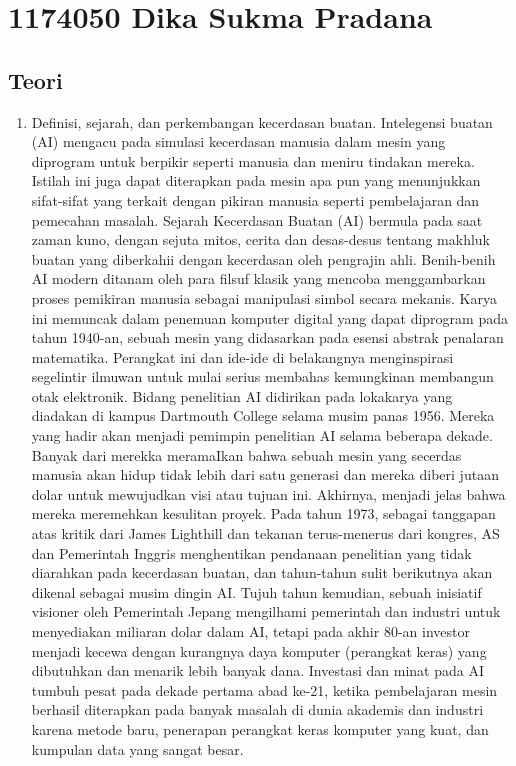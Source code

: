 \section{1174050 Dika Sukma Pradana}
\subsection{Teori}
\begin{enumerate}
\item Definisi, sejarah, dan perkembangan kecerdasan buatan.
\subitem Intelegensi buatan (AI) mengacu pada simulasi kecerdasan manusia dalam mesin yang diprogram untuk berpikir seperti manusia dan meniru tindakan mereka. Istilah ini juga dapat diterapkan pada mesin apa pun yang menunjukkan sifat-sifat yang terkait dengan pikiran manusia seperti pembelajaran dan pemecahan masalah.
\subitem Sejarah Kecerdasan Buatan (AI) bermula pada saat zaman kuno, dengan sejuta mitos, cerita dan desas-desus tentang makhluk buatan yang diberkahii dengan kecerdasan oleh pengrajin ahli. Benih-benih AI modern ditanam oleh para filsuf klasik yang mencoba menggambarkan proses pemikiran manusia sebagai manipulasi simbol secara mekanis. Karya ini memuncak dalam penemuan komputer digital yang dapat diprogram pada tahun 1940-an, sebuah mesin yang didasarkan pada esensi abstrak penalaran matematika. Perangkat ini dan ide-ide di belakangnya menginspirasi segelintir ilmuwan untuk mulai serius membahas kemungkinan membangun otak elektronik.
Bidang penelitian AI didirikan pada lokakarya yang diadakan di kampus Dartmouth College selama musim panas 1956. Mereka yang hadir akan menjadi pemimpin penelitian AI selama beberapa dekade. Banyak dari merekka meramaIkan bahwa sebuah mesin yang secerdas manusia akan hidup tidak lebih dari satu generasi dan mereka diberi jutaan dolar untuk mewujudkan visi atau tujuan ini.
Akhirnya, menjadi jelas bahwa mereka meremehkan kesulitan proyek. Pada tahun 1973, sebagai tanggapan atas kritik dari James Lighthill dan tekanan terus-menerus dari kongres, AS dan Pemerintah Inggris menghentikan pendanaan penelitian yang tidak diarahkan pada kecerdasan buatan, dan tahun-tahun sulit berikutnya akan dikenal sebagai musim dingin AI. Tujuh tahun kemudian, sebuah inisiatif visioner oleh Pemerintah Jepang mengilhami pemerintah dan industri untuk menyediakan miliaran dolar dalam AI, tetapi pada akhir 80-an investor menjadi kecewa dengan kurangnya daya komputer (perangkat keras) yang dibutuhkan dan menarik lebih banyak dana.
Investasi dan minat pada AI tumbuh pesat pada dekade pertama abad ke-21, ketika pembelajaran mesin berhasil diterapkan pada banyak masalah di dunia akademis dan industri karena metode baru, penerapan perangkat keras komputer yang kuat, dan kumpulan data yang sangat besar.

\end{enumerate}
